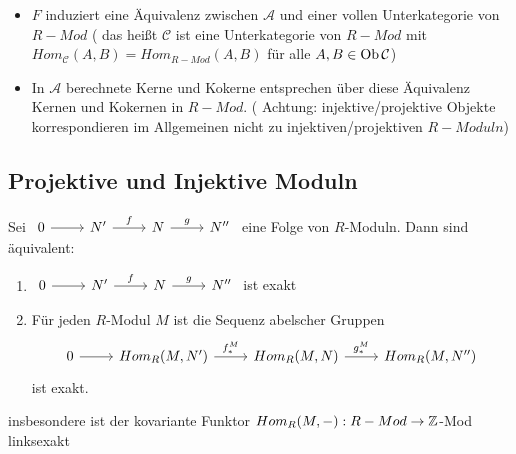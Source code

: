 \begin{anm}
	\begin{itemize}
		\item $F$ induziert eine Äquivalenz zwischen $\mathcal{A}$ und einer vollen Unterkategorie von $R-Mod $ ( das heißt $\mathcal{C} $ ist eine Unterkategorie von $R-Mod $ mit $ Hom_{\mathcal{C}}(A,B)= Hom_{R-Mod}(A,B) $ für alle $ A,B \in \text{Ob}\,\mathcal{C}$)
		\item In $\mathcal{A} $ berechnete Kerne und Kokerne entsprechen über diese Äquivalenz Kernen und Kokernen in $R-Mod$. ( Achtung: injektive/projektive Objekte korrespondieren im Allgemeinen nicht zu injektiven/projektiven $R-Moduln$)
	\end{itemize}
\end{anm}
\newpage 
\subsection{Projektive und Injektive Moduln}
\begin{sa}\label{6.1}
	Sei $\begin{tikzcd}
	0  \arrow{r} & N' \arrow{r}{f} & N \arrow{r}{g} & N'' 
	\end{tikzcd} $ eine Folge von $R$-Moduln. Dann sind äquivalent: 
	\begin{enumerate} [label= \roman*)]
		\item $\begin{tikzcd}
		0  \arrow{r} & N' \arrow{r}{f} & N \arrow{r}{g} & N'' 
		\end{tikzcd} $ ist exakt
		\item Für jeden $R$-Modul $M$ ist die Sequenz abelscher Gruppen  $$\begin{tikzcd}
		0  \arrow{r} & Hom_{R}(M,N') \arrow{r}{f_{*}^{M}} & Hom_{R}(M,N)  \arrow{r}{g_{*}^{M}} & Hom_{R}(M,N'') 
		\end{tikzcd} $$ ist exakt.
	\end{enumerate}
	insbesondere ist der kovariante Funktor $Hom_R(M,-): R-Mod \to \mathbb{Z}$-Mod linksexakt
\end{sa}
